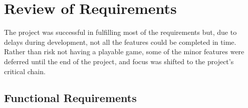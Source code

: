 \section{Review of Requirements}
\label{sec:reviewrequirements}

The project was successful in fulfilling most of the requirements but, due to delays during development, not all the features could be completed in time. Rather than risk not having a playable game, some of the minor features were deferred until the end of the project, and focus was shifted to the project's critical chain.

\subsection{Functional Requirements}

